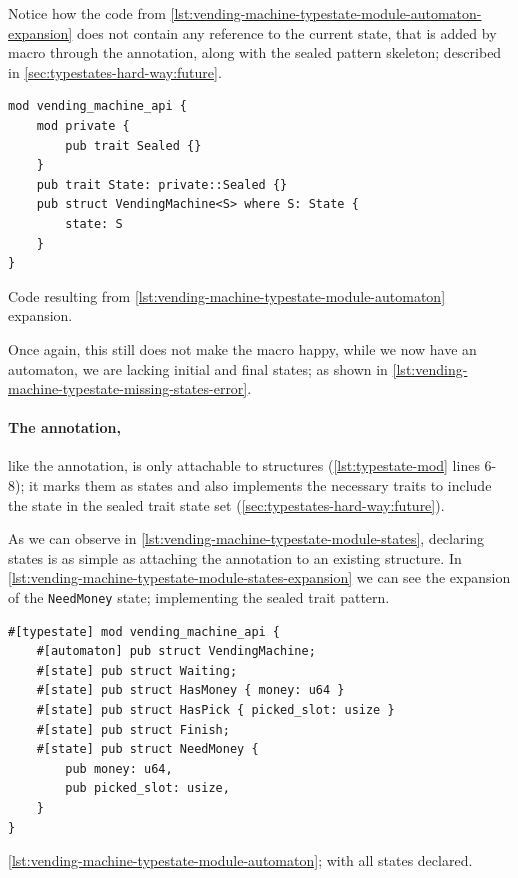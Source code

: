 Notice how the code from \autoref{lst:vending-machine-typestate-module-automaton-expansion} does not contain any reference to the current state,
that is added by macro through the \textcolor{attrgreen}{} annotation,
along with the sealed pattern skeleton; described in \autoref{sec:typestates-hard-way:future}.

\begin{listing}
    \begin{verbatim}
mod vending_machine_api {
    mod private {
        pub trait Sealed {}
    }
    pub trait State: private::Sealed {}
    pub struct VendingMachine<S> where S: State {
        state: S
    }
}
    \end{verbatim}
    \caption{Code resulting from \autoref{lst:vending-machine-typestate-module-automaton} expansion.}
    \label{lst:vending-machine-typestate-module-automaton-expansion}
\end{listing}

Once again, this still does not make the macro happy, while we now have an automaton, we are lacking initial and final states;
as shown in \autoref{lst:vending-machine-typestate-missing-states-error}.

\paragraph{The  annotation,} like the \textcolor{attrgreen}{} annotation, is only attachable to structures (\autoref{lst:typestate-mod} lines 6-8);
it marks them as states and also implements the necessary traits to include the state in the sealed trait state set (\autoref{sec:typestates-hard-way:future}).

As we can observe in \autoref{lst:vending-machine-typestate-module-states},
declaring states is as simple as attaching the annotation to an existing structure.
In \autoref{lst:vending-machine-typestate-module-states-expansion} we can see the expansion of the \texttt{NeedMoney} state;
implementing the sealed trait pattern.

\begin{listing}
    \begin{verbatim}
#[typestate] mod vending_machine_api {
    #[automaton] pub struct VendingMachine;
    #[state] pub struct Waiting;
    #[state] pub struct HasMoney { money: u64 }
    #[state] pub struct HasPick { picked_slot: usize }
    #[state] pub struct Finish;
    #[state] pub struct NeedMoney {
        pub money: u64,
        pub picked_slot: usize,
    }
}
    \end{verbatim}
    \caption{\autoref{lst:vending-machine-typestate-module-automaton}; with all states declared.}
    \label{lst:vending-machine-typestate-module-states}
\end{listing}

